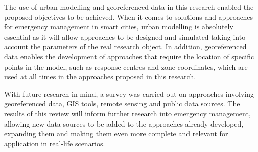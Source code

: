 
The use of urban modelling and georeferenced data in this research enabled the proposed objectives to be achieved. When it comes to solutions and approaches for emergency management in smart cities, urban modelling is absolutely essential as it will allow approaches to be designed and simulated taking into account the parameters of the real research object. In addition, georeferenced data enables the development of approaches that require the location of specific points in the model, such as response centres and zone coordinates, which are used at all times in the approaches proposed in this research.


With future research in mind, a survey was carried out on approaches involving georeferenced data, GIS tools, remote sensing and public data sources. The results of this review will inform further research into emergency management, allowing new data sources to be added to the approaches already developed, expanding them and making them even more complete and relevant for application in real-life scenarios.


